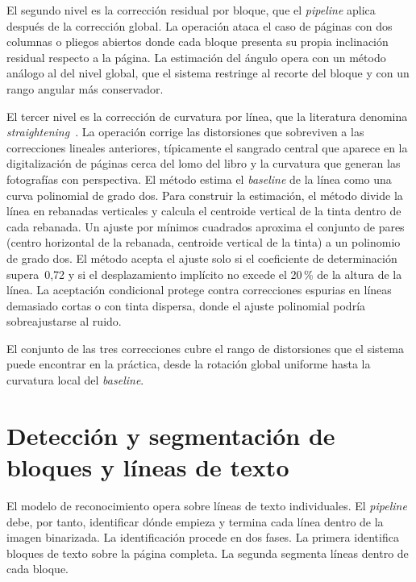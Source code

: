 El segundo nivel es la corrección residual por bloque, que el \textit{pipeline} aplica después de la corrección global. La operación ataca el caso de páginas con dos columnas o pliegos abiertos donde cada bloque presenta su propia inclinación residual respecto a la página. La estimación del ángulo opera con un método análogo al del nivel global, que el sistema restringe al recorte del bloque y con un rango angular más conservador.

El tercer nivel es la corrección de curvatura por línea, que la literatura denomina \textit{straightening}~\cite{zhang2002straightening}. La operación corrige las distorsiones que sobreviven a las correcciones lineales anteriores, típicamente el sangrado central que aparece en la digitalización de páginas cerca del lomo del libro y la curvatura que generan las fotografías con perspectiva. El método estima el \textit{baseline} de la línea como una curva polinomial de grado dos. Para construir la estimación, el método divide la línea en rebanadas verticales y calcula el centroide vertical de la tinta dentro de cada rebanada. Un ajuste por mínimos cuadrados aproxima el conjunto de pares (centro horizontal de la rebanada, centroide vertical de la tinta) a un polinomio de grado dos. El método acepta el ajuste solo si el coeficiente de determinación supera~0,72 y si el desplazamiento implícito no excede el 20\,\% de la altura de la línea. La aceptación condicional protege contra correcciones espurias en líneas demasiado cortas o con tinta dispersa, donde el ajuste polinomial podría sobreajustarse al ruido.

El conjunto de las tres correcciones cubre el rango de distorsiones que el sistema puede encontrar en la práctica, desde la rotación global uniforme hasta la curvatura local del \textit{baseline}.

\section{Detección y segmentación de bloques y líneas de texto}
\label{sec:deteccion-segmentacion}

El modelo de reconocimiento opera sobre líneas de texto individuales. El \textit{pipeline} debe, por tanto, identificar dónde empieza y termina cada línea dentro de la imagen binarizada. La identificación procede en dos fases. La primera identifica bloques de texto sobre la página completa. La segunda segmenta líneas dentro de cada bloque.

